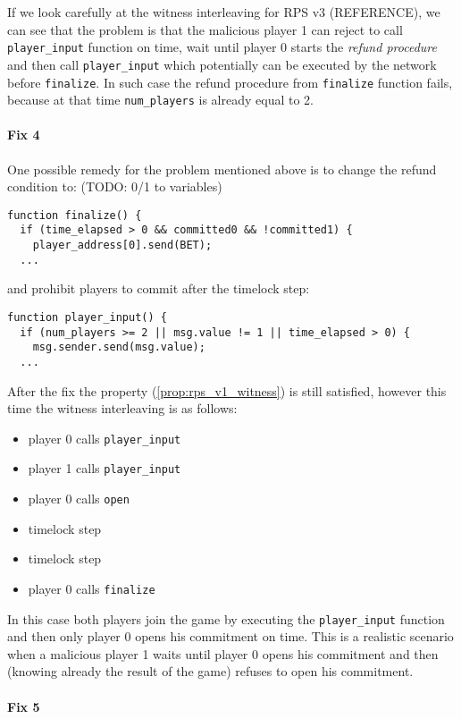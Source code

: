 \documentclass{article}
\begin{document}
If we look carefully at the witness interleaving for RPS v3 (REFERENCE), we can see that the problem is
that the malicious player 1 can reject to call \lstinline{player_input} function on time, wait until player 0 starts
the \emph{refund procedure} and then call \lstinline{player_input} which potentially can be executed by the 
network before \lstinline{finalize}.
In such case the refund procedure from \lstinline{finalize} function fails, because at that time
\lstinline{num_players} is already equal to 2.

\paragraph{Fix 4}

One possible remedy for the problem mentioned above is to change the refund condition to: (TODO: 0/1 to variables)
\begin{lstlisting}
function finalize() {
  if (time_elapsed > 0 && committed0 && !committed1) {
    player_address[0].send(BET);
  ...
\end{lstlisting}
and prohibit players to commit after the timelock step:
\begin{lstlisting}
function player_input() {
  if (num_players >= 2 || msg.value != 1 || time_elapsed > 0) {
    msg.sender.send(msg.value);
  ...
\end{lstlisting}

After the fix the property (\ref{prop:rps_v1_witness}) is still satisfied, however this time the witness interleaving
is as follows:
\begin{itemize}
\item player 0 calls \lstinline{player_input}
\item player 1 calls \lstinline{player_input}
\item player 0 calls \lstinline{open}
\item timelock step
\item timelock step
\item player 0 calls \lstinline{finalize}
\end{itemize}

In this case both players join the game by executing the \lstinline{player_input} function and then only
player 0 opens his commitment on time.
This is a realistic scenario when a malicious player 1 waits until player 0 opens his commitment and then 
(knowing already the result of the game) refuses to open his commitment.

\paragraph{Fix 5}
\end{document}
